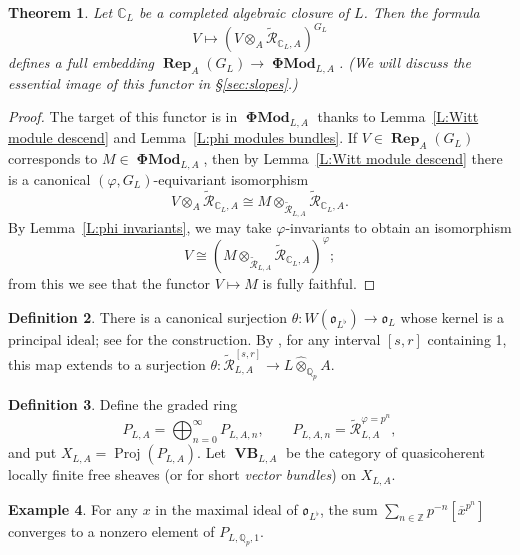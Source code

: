 \documentclass[12pt]{amsart}
\newtheorem{theorem}{Theorem}[section]
\theoremstyle{definition}
\newtheorem{defn}[theorem]{Definition}
\newtheorem{example}[theorem]{Example}
\numberwithin{equation}{theorem}
\newcommand{\CC}{\mathbb{C}}
\newcommand{\QQ}{\mathbb{Q}}
\newcommand{\ZZ}{\mathbb{Z}}
\newcommand{\calR}{\mathcal{R}}
\newcommand{\frako}{\mathfrak{o}}
\DeclareMathOperator{\PhiMod}{\mathbf{\Phi Mod}}
\DeclareMathOperator{\Proj}{Proj}
\DeclareMathOperator{\Rep}{\mathbf{Rep}}
\DeclareMathOperator{\VB}{\mathbf{VB}}
\begin{document}
\begin{theorem} \label{T:perfect embedding}
Let $\CC_L$ be a completed algebraic closure of $L$. Then the formula 
\[
V \mapsto (V \otimes_A \tilde{\calR}_{\CC_L, A})^{G_L}
\]
defines a full embedding $\Rep_A(G_L) \to \PhiMod_{L,A}$.
(We will discuss the essential image of this functor in \S\ref{sec:slopes}.)
\end{theorem}
\begin{proof}
The target of this functor is in $\PhiMod_{L,A}$ thanks to 
Lemma~\ref{L:Witt module descend} and Lemma~\ref{L:phi modules bundles}.
If $V \in \Rep_A(G_L)$ corresponds to $M \in \PhiMod_{L,A}$, 
then by Lemma~\ref{L:Witt module descend} there is a canonical $(\varphi, G_L)$-equivariant isomorphism
\[
V \otimes_A \tilde{\calR}_{\CC_L, A} \cong M \otimes_{\tilde{\calR}_{L,A}} \tilde{\calR}_{\CC_L,A}.
\]
By Lemma~\ref{L:phi invariants}, we may take $\varphi$-invariants to obtain an isomorphism
\[
V \cong (M \otimes_{\tilde{\calR}_{L,A}} \tilde{\calR}_{\CC_L,A})^{\varphi};
\]
from this we see that the functor $V \mapsto M$ is fully faithful.
\end{proof}

\begin{defn} \label{D:theta}
There is a canonical surjection $\theta: W(\frako_{L^\flat}) \to \frako_L$ whose kernel is a principal ideal; see
\cite[\S 1]{kedlaya-new-phigamma} for the construction.
By \cite[Lemma~5.5.5]{kedlaya-liu1}, for any interval $[s,r]$ containing 1,
this map extends to a surjection
$\theta: \tilde{\calR}^{[s,r]}_{L,A} \to L \widehat{\otimes}_{\QQ_p} A$.
\end{defn}

\begin{defn}
Define the graded ring
\[
P_{L,A} = \bigoplus_{n=0}^\infty P_{L,A,n}, \qquad P_{L,A,n} = \tilde{\calR}_{L,A}^{\varphi=p^n},
\]
and put $X_{L,A} = \Proj(P_{L,A})$.
Let $\VB_{L,A}$ be the category of quasicoherent locally finite free sheaves (or for short \emph{vector bundles}) on $X_{L,A}$.
\end{defn}

\begin{example}
For any $x$ in the maximal ideal of $\frako_{L^{\flat}}$, the sum $\sum_{n \in \ZZ} p^{-n} [\overline{x}^{p^n}]$
converges to a nonzero element of $P_{L,\QQ_p,1}$.
\end{example}
\end{document}
